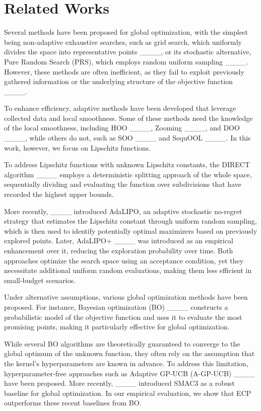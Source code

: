 \section{Related Works}
\label{related}


Several methods have been proposed for global optimization, with the simplest being non-adaptive exhaustive searches, such as grid search, which uniformly divides the space into representative points ____, or its stochastic alternative, Pure Random Search (PRS), which employs random uniform sampling ____. However, these methods are often inefficient, as they fail to exploit previously gathered information or the underlying structure of the objective function ____.

To enhance efficiency, adaptive methods have been developed that leverage collected data and local smoothness. Some of these methods need the knowledge of the local smoothness, including HOO ____, Zooming ____, and DOO ____, while others do not, such as SOO ____ and SequOOL ____. In this work, however, we focus on Lipschitz functions. 

To address Lipschitz functions with unknown Lipschitz constants, the DIRECT algorithm ____ employs a deterministic splitting approach of the whole space, sequentially dividing and evaluating the function over subdivisions that have recorded the highest upper bounds. 

More recently, ____ introduced AdaLIPO, an adaptive stochastic no-regret strategy that estimates the Lipschitz constant through uniform random sampling, which is then used to identify potentially optimal maximizers based on previously explored points. Later, AdaLIPO+ ____ was introduced as an empirical enhancement over it, reducing the exploration probability over time. Both approaches optimize the search space using an acceptance condition, yet they necessitate additional uniform random evaluations, making them less efficient in small-budget scenarios.

Under alternative assumptions, various global optimization methods have been proposed. For instance, Bayesian optimization (BO) ____ constructs a probabilistic model of the objective function and uses it to evaluate the most promising points, making it particularly effective for global optimization. 

While several BO algorithms are theoretically guaranteed to converge to the global optimum of the unknown function, they often rely on the assumption that the kernel's hyperparameters are known in advance. To address this limitation, hyperparameter-free approaches such as Adaptive GP-UCB (A-GP-UCB) ____ have been proposed. More recently, ____ introduced SMAC3 as a robust baseline for global optimization. In our empirical evaluation, we show that ECP outperforms these recent baselines from BO.


